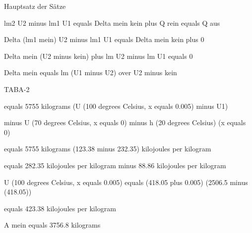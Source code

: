 Hauptsatz der Sätze

lm2 U2 minus lm1 U1 equals Delta mein kein plus Q rein equals Q aus

Delta (lm1 mein) U2 minus lm1 U1 equals Delta mein kein plus 0

Delta mein (U2 minus kein) plus lm U2 minus lm U1 equals 0

Delta mein equals lm (U1 minus U2) over U2 minus kein

TABA-2

equals 5755 kilograms (U (100 degrees Celsius, x equals 0.005) minus U1)

minus U (70 degrees Celsius, x equals 0) minus h (20 degrees Celsius) (x equals 0)

equals 5755 kilograms (123.38 minus 232.35) kilojoules per kilogram

equals 282.35 kilojoules per kilogram minus 88.86 kilojoules per kilogram

U (100 degrees Celsius, x equals 0.005) equals (418.05 plus 0.005) (2506.5 minus (418.05))

equals 423.38 kilojoules per kilogram

A mein equals 3756.8 kilograms